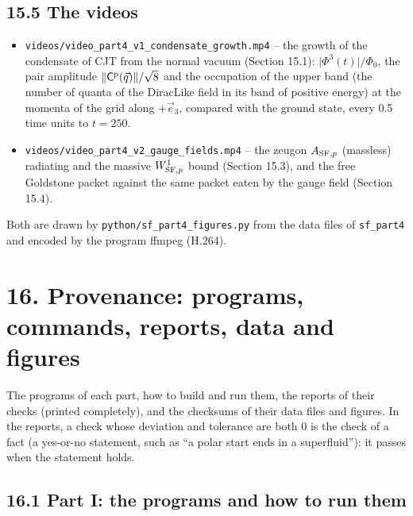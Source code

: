 \documentclass[
  10pt,
]{article}
\providecommand{\tightlist}{%
  \setlength{\itemsep}{0pt}\setlength{\parskip}{0pt}}
\begin{document}
\hypertarget{the-videos}{%
\subsection{15.5 The videos}\label{the-videos}}

\begin{itemize}
\tightlist
\item
  \texttt{videos/video\_part4\_v1\_condensate\_growth.mp4} -- the growth
  of the condensate of CJT from the normal vacuum (Section 15.1):
  \(\lvert\Phi^3(t)\rvert/\Phi_0\), the pair amplitude
  \(\lVert\mathsf C^{\rm p}(\vec q)\rVert/\sqrt8\) and the occupation of
  the upper band (the number of quanta of the DiracLike field in its
  band of positive energy) at the momenta of the grid along
  \(+\vec e_3\), compared with the ground state, every 0.5 time units to
  \(t=250\).
\item
  \texttt{videos/video\_part4\_v2\_gauge\_fields.mp4} -- the zeugon
  \(A_{{\rm SF},p}\) (massless) radiating and the massive
  \(W^1_{{\rm SF},p}\) bound (Section 15.3), and the free Goldstone
  packet against the same packet eaten by the gauge field (Section
  15.4).
\end{itemize}

Both are drawn by \texttt{python/sf\_part4\_figures.py} from the data
files of \texttt{sf\_part4} and encoded by the program ffmpeg (H.264).

\hypertarget{provenance-programs-commands-reports-data-and-figures}{%
\section{16. Provenance: programs, commands, reports, data and
figures}\label{provenance-programs-commands-reports-data-and-figures}}

The programs of each part, how to build and run them, the reports of
their checks (printed completely), and the checksums of their data files
and figures. In the reports, a check whose deviation and tolerance are
both 0 is the check of a fact (a yes-or-no statement, such as ``a polar
start ends in a superfluid''): it passes when the statement holds.

\hypertarget{part-i-the-programs-and-how-to-run-them}{%
\subsection{16.1 Part I: the programs and how to run
them}\label{part-i-the-programs-and-how-to-run-them}}
\end{document}
